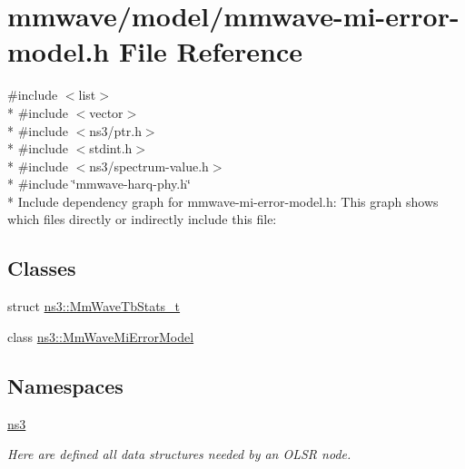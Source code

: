 \hypertarget{mmwave-mi-error-model_8h}{}\section{mmwave/model/mmwave-\/mi-\/error-\/model.h File Reference}
\label{mmwave-mi-error-model_8h}
{\ttfamily \#include $<$list$>$}\\*
{\ttfamily \#include $<$vector$>$}\\*
{\ttfamily \#include $<$ns3/ptr.\+h$>$}\\*
{\ttfamily \#include $<$stdint.\+h$>$}\\*
{\ttfamily \#include $<$ns3/spectrum-\/value.\+h$>$}\\*
{\ttfamily \#include \char`\"{}mmwave-\/harq-\/phy.\+h\char`\"{}}\\*
Include dependency graph for mmwave-\/mi-\/error-\/model.h\+:
This graph shows which files directly or indirectly include this file\+:
\subsection*{Classes}
\begin{DoxyCompactItemize}
\item 
struct \hyperlink{structns3_1_1MmWaveTbStats__t}{ns3\+::\+Mm\+Wave\+Tb\+Stats\+\_\+t}
\item 
class \hyperlink{classns3_1_1MmWaveMiErrorModel}{ns3\+::\+Mm\+Wave\+Mi\+Error\+Model}
\end{DoxyCompactItemize}
\subsection*{Namespaces}
\begin{DoxyCompactItemize}
\item 
 \hyperlink{namespacens3}{ns3}
\begin{DoxyCompactList}\small\item\em Here are defined all data structures needed by an O\+L\+SR node. \end{DoxyCompactList}\end{DoxyCompactItemize}
